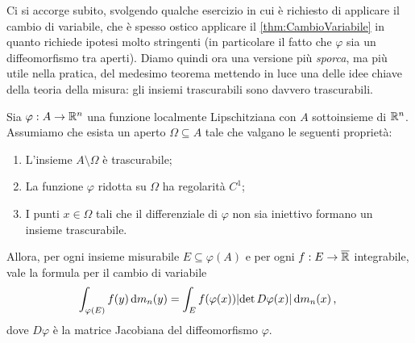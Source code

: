 Ci si accorge subito, svolgendo qualche esercizio in cui è richiesto di applicare il cambio di variabile, che è spesso ostico applicare il \cref{thm:CambioVariabile} in quanto richiede ipotesi molto stringenti (in particolare il fatto che $\varphi$ sia un diffeomorfismo tra aperti). 
Diamo quindi ora una versione più \emph{sporca}, ma più utile nella pratica, del medesimo teorema mettendo in luce una delle idee chiave della teoria della misura: gli insiemi trascurabili sono davvero trascurabili.

\begin{corollary}\label{cor:CambioVariabileSporco}
	Sia $\varphi:A\to\mathbb R^n$ una funzione localmente Lipschitziana con $A$ sottoinsieme di $\mathbb R^n$.
	Assumiamo che esista un aperto $\Omega\subseteq A$ tale che valgano le seguenti proprietà:
	\begin{enumerate}
		\item L'insieme $A\setminus \Omega$ è trascurabile;
		\item La funzione $\varphi$ ridotta su $\Omega$ ha regolarità $C^1$;
		\item I punti $x\in\Omega$ tali che il differenziale di $\varphi$ non sia iniettivo formano un insieme trascurabile.
	\end{enumerate}
	
	Allora, per ogni insieme misurabile $E\subseteq \varphi(A)$ e per ogni $f:E\to\overline{\mathbb R}$ integrabile, vale la formula per il cambio di variabile
	\begin{equation*}
		\int_{\varphi(E)} f(y)\,\mathrm d m_n(y) = \int_{E} f(\varphi(x))\lvert \det D\varphi(x) \rvert \,\mathrm d m_n(x) \, \text{, }
	\end{equation*}
	dove $D\varphi$ è la matrice Jacobiana del diffeomorfismo $\varphi$.
\end{corollary}
